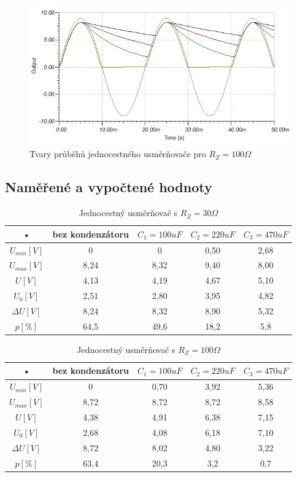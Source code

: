 \documentclass[12pt]{article} %
\begin{document}
\begin{figure}[H]
\center
\includegraphics[scale=0.6]{jednocestny100.jpg}
\caption{Tvary průběhů jednocestného usměrňovače pro $R_Z = 100\Omega$}
\end{figure}

\subsection{Naměřené a vypočtené hodnoty}
\begin{table}[H]
\center
\begin{tabular}{|c|c|c|c|c|}
\hline 
• & bez kondenzátoru & $C_1 = 100uF$ & $C_2 = 220uF$ & $C_3 = 470uF$ \\ 
\hline 
$U_{min} [V]$ & 0 & 0 & 0,50 & 2,68 \\ 
\hline 
$U_{max} [V]$ & 8,24 & 8,32 & 9,40 & 8,00 \\ 
\hline 
$U [V]$ & 4,13 & 4,19 & 4,67 & 5,10 \\ 
\hline 
$U_0 [V]$ & 2,51 & 2,80 & 3,95 & 4,82 \\ 
\hline 
$\Delta U [V]$ & 8,24 & 8,32 & 8,90 & 5,32 \\ 
\hline 
$p [\%]$ & 64,5 & 49,6 & 18,2 & 5,8 \\ 
\hline 
\end{tabular}
\caption{Jednocestný usměrňovač s $R_Z=30\Omega$}
\end{table}

\begin{table}[H]
\center
\begin{tabular}{|c|c|c|c|c|}
\hline 
• & bez kondenzátoru & $C_1 = 100uF$ & $C_2 = 220uF$ & $C_3 = 470uF$ \\ 
\hline 
$U_{min} [V]$ & 0 & 0,70 & 3,92 & 5,36 \\ 
\hline 
$U_{max} [V]$ & 8,72 & 8,72 & 8,72 & 8,58 \\ 
\hline 
$U [V]$ & 4,38 & 4,91 & 6,38 & 7,15 \\ 
\hline 
$U_0 [V]$ & 2,68 & 4,08 & 6,18 & 7,10 \\ 
\hline 
$\Delta U [V]$ & 8,72 & 8,02 & 4,80 & 3,22 \\ 
\hline 
$p [\%]$ & 63,4 & 20,3 & 3,2 & 0,7 \\ 
\hline 
\end{tabular}
\caption{Jednocestný usměrňovač s $R_Z=100\Omega$}
\end{table}
\end{document}
